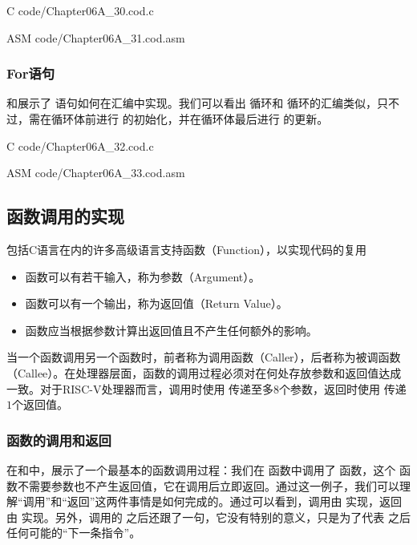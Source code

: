 \begin{Code}{C}
    code/Chapter06A_30.cod.c
\end{Code}

\begin{Code}{ASM}
    code/Chapter06A_31.cod.asm
\end{Code}

\subsubsection{For语句}
和展示了 语句如何在汇编中实现。我们可以看出 循环和 循环的汇编类似，只不过，需在循环体前进行 的初始化，并在循环体最后进行 的更新。
\begin{Code}{C}
    code/Chapter06A_32.cod.c
\end{Code}

\begin{Code}{ASM}
    code/Chapter06A_33.cod.asm
\end{Code}

\subsection{函数调用的实现}
包括C语言在内的许多高级语言支持函数（Function），以实现代码的复用
\begin{itemize}
    \item 函数可以有若干输入，称为参数（Argument）。
    \item 函数可以有一个输出，称为返回值（Return Value）。
    \item 函数应当根据参数计算出返回值且不产生任何额外的影响。
\end{itemize}
当一个函数调用另一个函数时，前者称为调用函数（Caller），后者称为被调函数（Callee）。在处理器层面，函数的调用过程必须对在何处存放参数和返回值达成一致。对于RISC-V处理器而言，调用时使用 传递至多$8$个参数，返回时使用 传递$1$个返回值。

\subsubsection{函数的调用和返回}
在和中，展示了一个最基本的函数调用过程：我们在 函数中调用了 函数，这个 函数不需要参数也不产生返回值，它在调用后立即返回。通过这一例子，我们可以理解“调用”和“返回”这两件事情是如何完成的。通过可以看到，调用由 实现，返回由 实现。另外，调用的 之后还跟了一句，它没有特别的意义，只是为了代表 之后任何可能的“下一条指令”。

